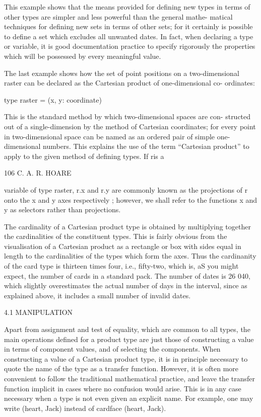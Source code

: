 This example shows that the means provided for defining new types in terms of other types are simpler and less powerful than the general mathe- matical techniques for defining new sets in terms of other sets; for it certainly is possible to define a set which excludes all unwanted dates. In fact, when declaring a type or variable, it is good documentation practice to specify rigorously the properties which will be possessed by every meaningful value.

The last example shows how the set of point positions on a two-dimensional raster can be declared as the Cartesian product of one-dimensional co- ordinates:

type raster = (x, y: coordinate)

This is the standard method by which two-dimensional spaces are con- structed out of a single-dimension by the method of Cartesian coordinates; for every point in two-dimensional space can be named as an ordered pair of simple one-dimensional numbers. This explains the use of the term “Cartesian product” to apply to the given method of defining types. If ris a

106 C. A. R. HOARE

variable of type raster, r.x and r.y are commonly known as the projections of r onto the x and y axes respectively ; however, we shall refer to the functions x and y as selectors rather than projections.

The cardinality of a Cartesian product type is obtained by multiplying together the cardinalities of the constituent types. This is fairly obvious from the visualisation of a Cartesian product as a rectangle or box with sides equal in length to the cardinalities of the types which form the axes. Thus the cardinanity of the card type is thirteen times four, i.e., fifty-two, which is, aS you might expect, the number of cards in a standard pack. The number of dates is 26 040, which slightly overestimates the actual number of days in the interval, since as explained above, it includes a small number of invalid dates.

4.1 MANIPULATION

Apart from assignment and test of equality, which are common to all types, the main operations defined for a product type are just those of constructing a value in terms of component values, and of selecting the components. When constructing a value of a Cartesian product type, it is in principle necessary to quote the name of the type as a transfer function. However, it is often more convenient to follow the traditional mathematical practice, and leave the transfer function implicit in cases where no confusion would arise. This is in any case necessary when a type is not even given an explicit name. For example, one may write (heart, Jack) instead of cardface (heart, Jack).

